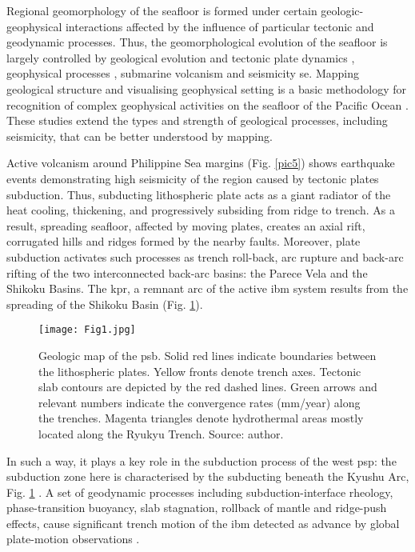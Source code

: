 \documentclass{rrparticle}
\begin{document}
Regional geomorphology of the seafloor is formed under certain geologic-geophysical interactions affected by the influence of particular tectonic and geodynamic processes. Thus, the geomorphological evolution of the seafloor is largely controlled by geological evolution and tectonic plate dynamics \cite{Fujioka2002,Gong,Lemenkova2019a,Lemenkova2021a}, geophysical processes \cite{Seekings,Hall1995a,Ogawa}, submarine volcanism and seismicity se\cite{Ozawa,Lemenkova2020g,Lemenkova2021e}. Mapping geological structure and visualising geophysical setting is a basic methodology for recognition of complex geophysical activities on the seafloor of the Pacific Ocean \cite{PARCUTELA2020100032,BARRETTO2020106052,QINGYUN2021103504}. These studies extend the types and strength of geological processes, including seismicity, that can be better understood by mapping.

Active volcanism around Philippine Sea margins (Fig. \ref{pic5}) shows earthquake events demonstrating high seismicity of the region caused by tectonic plates subduction. Thus, subducting lithospheric plate acts as a giant radiator of the heat cooling, thickening, and progressively subsiding from ridge to trench. As a result, spreading seafloor, affected by moving plates, creates an axial rift, corrugated hills and ridges formed by the nearby faults. Moreover, plate subduction activates such processes as trench roll-back, arc rupture and back-arc rifting of the two interconnected back-arc basins: the Parece Vela and the Shikoku Basins. The \ac{kpr}, a remnant arc of the active \ac{ibm} system results from the spreading of the Shikoku Basin (Fig. \ref{pic1}). 

\begin{figure}[H]
\centering
\texttt{[image: Fig1.jpg]}
\caption{Geologic map of the \ac{psb}. Solid red lines indicate boundaries between the lithospheric plates. Yellow fronts denote trench axes. Tectonic slab contours are depicted by the red dashed lines. Green arrows and relevant numbers indicate the convergence rates (mm/year) along the trenches. Magenta triangles denote hydrothermal areas mostly located along the Ryukyu Trench. Source: author.}
\label{pic1}
\end{figure}

In such a way, it plays a key role in the subduction process of the west \ac{psp}: the subduction zone here is characterised by the subducting beneath the Kyushu Arc, Fig. \ref{pic1} \cite{Cao}. A set of geodynamic processes including subduction-interface rheology, phase-transition buoyancy, slab stagnation, rollback of mantle and ridge-push effects, cause significant trench motion of the \ac{ibm} detected as advance by global plate-motion observations \cite{Bina,Cizkova}. 
\end{document}
